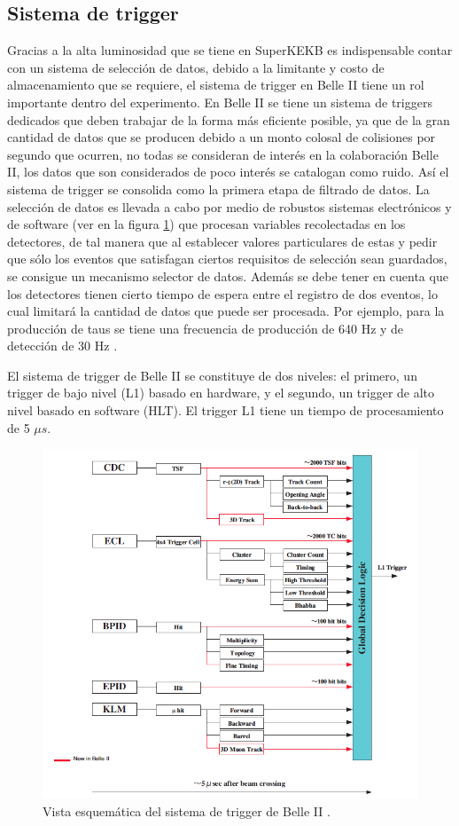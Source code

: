 \subsection{Sistema de trigger}

Gracias a la alta luminosidad que se tiene en SuperKEKB es indispensable contar con un sistema de selección de datos, debido a la limitante y costo de almacenamiento que se requiere, el sistema de trigger en Belle II tiene un rol importante dentro del experimento. En Belle II se tiene un sistema de triggers dedicados que deben trabajar de la forma más eficiente posible, ya que de la gran cantidad de datos que se producen debido a un monto colosal de colisiones por segundo que ocurren, no todas se consideran de interés en la colaboración Belle II, los datos que son considerados de poco interés se catalogan como ruido. Así el sistema de trigger se consolida como la primera etapa de filtrado de datos. La selección de datos es llevada a cabo por medio de robustos sistemas electrónicos y de software (ver en la figura \ref{fig:trigger}) que procesan variables recolectadas en los detectores, de tal manera que al establecer valores particulares de estas y pedir que sólo los eventos que satisfagan ciertos requisitos de selección sean guardados, se consigue un mecanismo selector de datos. Además se debe tener en cuenta que los detectores tienen cierto tiempo de espera entre el registro de dos eventos, lo cual limitará la cantidad de datos que puede ser procesada. Por ejemplo, para la producción de taus se tiene una frecuencia de producción de 640 Hz y de detección de 30 Hz \cite{abe2010belle}.

El sistema de trigger de Belle II se constituye de dos niveles: el primero, un trigger de bajo nivel (L1) basado en hardware, y el segundo, un trigger de alto nivel basado en software (HLT). El trigger L1 tiene un tiempo de procesamiento de 5 \(\mu s\).
\begin{figure}[h]
    \centering
    \includegraphics[scale=.6]{Images/trigger.png}
    \caption{\small Vista esquemática del sistema de trigger de Belle II \cite{abe2010belle}.}
    \label{fig:trigger}
\end{figure}

